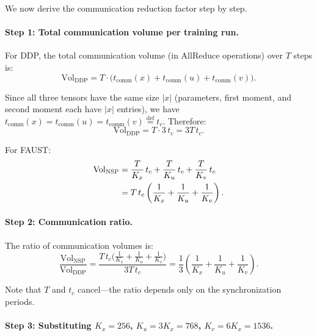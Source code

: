 \documentclass{article}
\begin{document}
We now derive the communication reduction factor step by step.

\paragraph{Step 1: Total communication volume per training run.}

For DDP, the total communication volume (in AllReduce operations) over
$T$ steps is:
\begin{equation}
\text{Vol}_{\text{DDP}} = T \cdot \bigl(
t_{\text{comm}}(x) + t_{\text{comm}}(u) + t_{\text{comm}}(v)\bigr).
\label{eq:vol_ddp}
\end{equation}

Since all three tensors have the same size $|x|$ (parameters, first
moment, and second moment each have $|x|$ entries), we have
$t_{\text{comm}}(x) = t_{\text{comm}}(u) = t_{\text{comm}}(v)
\stackrel{\text{def}}{=} t_c$. Therefore:
\begin{equation}
\text{Vol}_{\text{DDP}} = T \cdot 3\,t_c = 3T\,t_c.
\label{eq:vol_ddp_simplified}
\end{equation}

For FAUST:
\begin{align}
\text{Vol}_{\text{NSP}}
&= \frac{T}{K_x}\,t_c + \frac{T}{K_u}\,t_c + \frac{T}{K_v}\,t_c
\notag \\
&= T\,t_c \left(\frac{1}{K_x} + \frac{1}{K_u} + \frac{1}{K_v}\right).
\label{eq:vol_nsp}
\end{align}

\paragraph{Step 2: Communication ratio.}

The ratio of communication volumes is:
\begin{equation}
\frac{\text{Vol}_{\text{NSP}}}{\text{Vol}_{\text{DDP}}}
= \frac{T\,t_c\bigl(\frac{1}{K_x} + \frac{1}{K_u} + \frac{1}{K_v}\bigr)}{3T\,t_c}
= \frac{1}{3}\left(\frac{1}{K_x} + \frac{1}{K_u} + \frac{1}{K_v}\right).
\label{eq:comm_ratio}
\end{equation}

Note that $T$ and $t_c$ cancel---the ratio depends only on the
synchronization periods.

\paragraph{Step 3: Substituting $K_x = 256$, $K_u = 3K_x = 768$,
$K_v = 6K_x = 1536$.}
\end{document}

